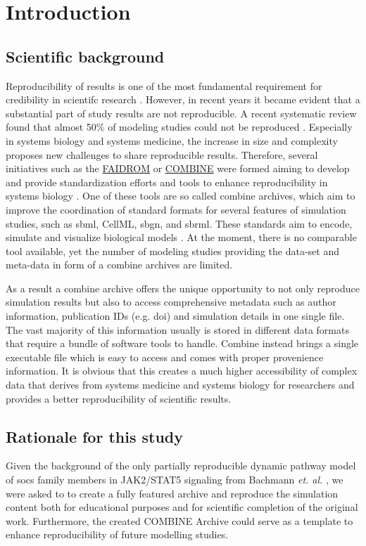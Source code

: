 \section*{Introduction}

\subsection*{Scientific background}
Reproducibility of results is one of the most fundamental requirement for credibility in scientifc research \cite{tiwari2021reproducibility}. However, in recent years it became evident that a substantial part of study results are not reproducible. A recent systematic review found that almost 50\% of modeling studies could not be reproduced \cite{tiwari2021reproducibility}. Especially in systems biology and systems medicine, the increase in size and complexity proposes new challenges to share reproducible results. Therefore, several initiatives such as the \hyperlink{https://fair-dom.org/}{FAIDROM} or \hyperlink{http://co.mbine.org/}{COMBINE} were formed aiming to develop and provide standardization efforts and tools to enhance reproducibility in systems biology \cite{specificationsb}. One of these tools are so called \ac{combine} archives, which aim to improve the coordination of standard formats for several features of simulation studies, such as \ac{sbml}, CellML, \ac{sbgn}, and \ac{sbrml}. These standards aim to encode, simulate and visualize biological models \cite{combine}. At the moment, there is no comparable tool available, yet the number of modeling studies providing the data-set and meta-data in form of a \ac{combine} archives are limited. 

As a result a \ac{combine} archive offers the unique opportunity to not only reproduce simulation results but also to access comprehensive metadata such as author information, publication IDs (e.g. \ac{doi}) and simulation details in one single file. The vast majority of this information usually  is stored in different data formats that require a bundle of software tools to handle. Combine instead brings a single executable file which is easy to access and comes with proper provenience information. It is obvious that this creates a much higher accessibility of complex data that derives from systems medicine and systems biology for researchers and provides a better reproducibility of scientific results.

\subsection*{Rationale for this study}
Given the background of the only partially reproducible dynamic pathway model of \ac{socs} family members in JAK2/STAT5 signaling from Bachmann \textit{et. al.} \cite{bachmannmodel}, we  were asked to  to create a fully featured archive and reproduce the simulation content both for educational purposes and for scientific completion of the original work. Furthermore, the created COMBINE Archive could serve as a template to enhance reproducibility of future modelling studies.

